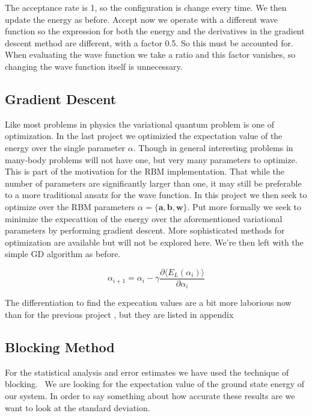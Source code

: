 The acceptance rate is 1, so the configuration is change every time. We then update the energy as before. Accept now we operate with a different wave function so the expression for both the energy and the derivatives in the gradient descent method are different, with a factor 0.5. So this must be accounted for. When evaluating the wave function we take a ratio and this factor vanishes, so changing the wave function itself is unnecessary.


\subsection{Gradient Descent}

Like most problems in physics the variational quantum problem is one of optimization. In the last project we optimizied the expectation value of the energy over the single parameter $\alpha$. Though in general interesting problems in many-body problems will not have one, but very many parameters to optimize. This is part of the motivation for the RBM implementation. That while the number of parameters are significantly larger than one, it may still be preferable to a more traditional ansatz for the wave function. In this project we then seek to optimize over the RBM parameters $\alpha = \{\mathbf{a}, \mathbf{b}, \mathbf{w}\}$. Put more formally we seek to minimize the expecattion of the energy over the aforementioned variational parameters by performing gradient descent. More sophisticated methods for optimization are available but will not be explored here. We're then left with the simple GD algorithm as before.

\begin{equation}
\alpha_{i+1} = \alpha_i -\gamma \frac{\partial \langle E_L (\alpha_i) \rangle}{\partial \alpha_i}
\end{equation}

The differentiation to find the expecation values are a bit more laborious now than for the previous project , but they are listed in appendix 

\subsection{Blocking Method}

For the statistical analysis and error estimates we have used the technique of blocking. \
We are looking for the expectation value of the ground state energy of our system. In order to say something about how accurate these results are we want to look at the standard deviation. 

